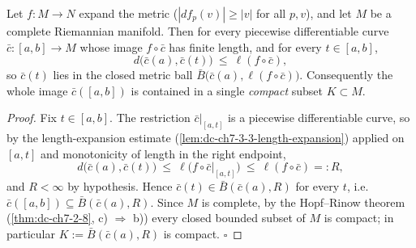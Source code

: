 \begin{lemma}
  \label{lem:dc-ch7-3-3-relatively-compact-lift}
  \leanok
  Let $f:M\to N$ expand the metric ($|df_p(v)|\ge|v|$ for all $p,v$), and let $M$
  be a complete Riemannian manifold. Then for every piecewise differentiable
  curve $\bar c:[a,b]\to M$ whose image $f\circ\bar c$ has finite length, and for
  every $t\in[a,b]$,
  $$
  d\big(\bar c(a),\bar c(t)\big)\ \le\ \ell(f\circ\bar c),
  $$
  so $\bar c(t)$ lies in the closed metric ball $\bar B\big(\bar c(a),\ell(f\circ\bar c)\big)$.
  Consequently the whole image $\bar c([a,b])$ is contained in a single
  \emph{compact} subset $K\subset M$.
\end{lemma}
\begin{proof}
  \leanok
  Fix $t\in[a,b]$. The restriction $\bar c|_{[a,t]}$ is a piecewise
  differentiable curve, so by the length-expansion estimate
  (\cref{lem:dc-ch7-3-3-length-expansion}) applied on $[a,t]$ and monotonicity of
  length in the right endpoint,
  $$
  d\big(\bar c(a),\bar c(t)\big)\ \le\ \ell\big(f\circ\bar c|_{[a,t]}\big)\ \le\ \ell(f\circ\bar c)=:R,
  $$
  and $R<\infty$ by hypothesis. Hence $\bar c(t)\in\bar B(\bar c(a),R)$ for every
  $t$, i.e. $\bar c([a,b])\subseteq\bar B(\bar c(a),R)$. Since $M$ is complete, by
  the Hopf–Rinow theorem (\cref{thm:dc-ch7-2-8}, c) $\Rightarrow$ b)) every closed
  bounded subset of $M$ is compact; in particular $K:=\bar B(\bar c(a),R)$ is
  compact. $\square$
\end{proof}

